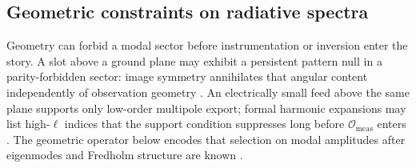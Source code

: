 \subsection{Geometric constraints on radiative spectra}
\label{sec:ch264}
Geometry can forbid a modal sector before instrumentation or inversion enter the story.
A slot above a ground plane may exhibit a persistent pattern null in a parity-forbidden sector:
image symmetry annihilates that angular content independently of observation geometry
\cite{collin2001,stratton1941}.
An electrically small feed above the same plane supports only low-order multipole export; formal
harmonic expansions may list high-$\ell$ indices that the support condition suppresses long before
$\mathcal{O}_{\mathrm{meas}}$ enters \cite{jackson1999}. The geometric operator below encodes
that selection on modal amplitudes after eigenmodes and Fredholm structure are known
\cite{stratton1941}.

